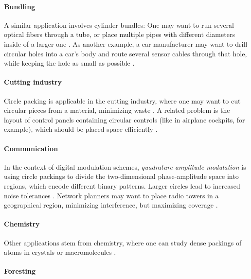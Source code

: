 \documentclass[a4paper,style=print,bibliography=totoc,nexus,lnum,extramargin]{tubsbook}
\begin{document}
\paragraph{Bundling}

A similar application involves cylinder bundles:
One may want to run several optical fibers through a tube, or place multiple pipes with different diameters inside of a larger one \parencite{WHZX2002improved}. As another example, a car manufacturer may want to drill circular holes into a car's body and route several sensor cables through that hole, while keeping the hole as small as possible \cite{SSSKK2004disk}.

\paragraph{Cutting industry}

Circle packing is applicable in the cutting industry, where one may want to cut circular pieces from a material, minimizing waste \cite{SMCSCG2007new}.
A related problem is the layout of control panels containing circular controls (like in airplane cockpits, for example), which should be placed space-efficiently \parencite{CKP2008solving}.

\paragraph{Communication}

In the context of digital modulation schemes, \emph{quadrature amplitude modulation} is using circle packings to divide the two-dimensional phase-amplitude space into regions, which encode different binary patterns. Larger circles lead to increased noise tolerances \parencite{PWMD1992packing}.
Network planners may want to place radio towers in a geographical region, minimizing interference, but maximizing coverage \parencite{SMCSCG2007new}.

\paragraph{Chemistry}

Other applications stem from chemistry, where one can study dense packings of atoms in crystals or macromolecules \cite{WMP1994history}.

\paragraph{Foresting}
\end{document}
